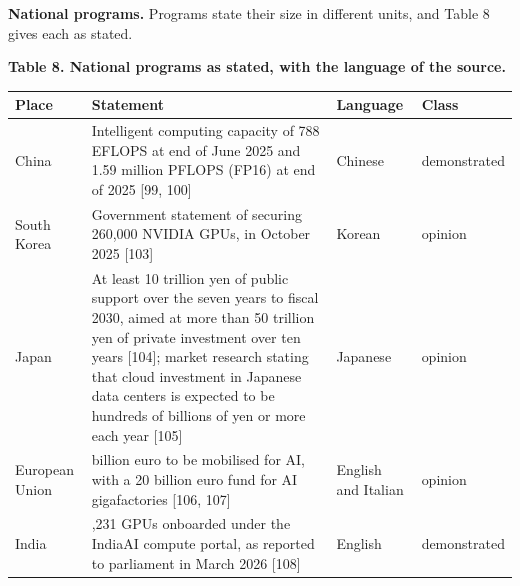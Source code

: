 \documentclass[10pt,letterpaper]{article}
\newcounter{none}
\begin{document}
\textbf{National programs.} Programs state their size in different
units, and Table 8 gives each as stated.

\textbf{Table 8. National programs as stated, with the language of the
source.}

{\def\LTcaptype{none} %
{\footnotesize\setlength{\tabcolsep}{3.8pt}\renewcommand{\arraystretch}{1.15}
\begin{longtable}[]{@{}
  >{\raggedright\arraybackslash}p{}
  >{\raggedright\arraybackslash}p{}
  >{\raggedright\arraybackslash}p{}
  >{\raggedright\arraybackslash}p{}@{}}
\toprule\noalign{}
\begin{minipage}[b]{\linewidth}\raggedright
\textbf{Place}
\end{minipage} & \begin{minipage}[b]{\linewidth}\raggedright
\textbf{Statement}
\end{minipage} & \begin{minipage}[b]{\linewidth}\raggedright
\textbf{Language}
\end{minipage} & \begin{minipage}[b]{\linewidth}\raggedright
\textbf{Class}
\end{minipage} \\
\midrule\noalign{}
\endhead
\bottomrule\noalign{}
\endlastfoot
China & Intelligent computing capacity of 788 EFLOPS at end of June 2025
and 1.59 million PFLOPS (FP16) at end of 2025 {[}99, 100{]} & Chinese &
demonstrated \\
South Korea & Government statement of securing 260,000 NVIDIA GPUs, in
October 2025 {[}103{]} & Korean & opinion \\
Japan & At least 10 trillion yen of public support over the seven years
to fiscal 2030, aimed at more than 50 trillion yen of private investment
over ten years {[}104{]}; market research stating that cloud investment
in Japanese data centers is expected to be hundreds of billions of yen
or more each year {[}105{]} & Japanese & opinion \\
European Union & 200 billion euro to be mobilised for AI, with a 20
billion euro fund for AI gigafactories {[}106, 107{]} & English and
Italian & opinion \\
India & 38,231 GPUs onboarded under the IndiaAI compute portal, as
reported to parliament in March 2026 {[}108{]} & English &
demonstrated \\

\end{longtable}}}
\end{document}
